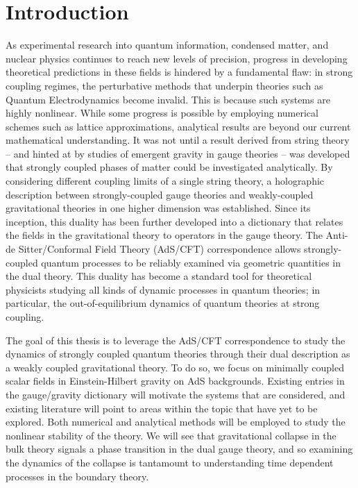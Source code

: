 \documentclass[../PhD.tex]{subfiles}
\begin{document}

\chapter{Introduction}
\label{ch: intro}

As experimental research into quantum information, condensed matter, and nuclear physics continues to reach new levels of precision, progress in developing theoretical predictions in these fields is hindered by a fundamental flaw: in strong coupling regimes, the perturbative methods that underpin theories such as Quantum Electrodynamics become invalid. This is because such systems are highly nonlinear. While some progress is possible by employing numerical schemes such as lattice approximations, analytical results are beyond our current mathematical understanding. It was not until a result derived from string theory -- and hinted at by studies of emergent gravity in gauge theories -- was developed that  strongly coupled phases of matter could be investigated analytically. By considering different coupling limits of a single string theory, a holographic description between strongly-coupled gauge theories and weakly-coupled gravitational theories in one higher dimension was established. Since its inception, this duality has been further developed into a dictionary that relates the fields in the gravitational theory to operators in the gauge theory. The Anti-de Sitter/Conformal Field Theory (AdS/CFT) correspondence allows strongly-coupled quantum processes to be reliably examined via geometric quantities in the dual theory. This duality has become a standard tool for theoretical physicists studying all kinds of dynamic processes in quantum theories; in particular, the out-of-equilibrium dynamics of quantum theories at strong coupling.

The goal of this thesis is to leverage the AdS/CFT correspondence to study the dynamics of strongly coupled quantum theories through their dual description as a weakly coupled gravitational theory. To do so, we focus on minimally coupled scalar fields in Einstein-Hilbert gravity on AdS backgrounds. Existing entries in the gauge/gravity dictionary will motivate the systems that are considered, and existing literature will point to areas within the topic that have yet to be explored. Both numerical and analytical methods will be employed to study the nonlinear stability of the theory. We will see that gravitational collapse in the bulk theory signals a phase transition in the dual gauge theory, and so examining the dynamics of the collapse is tantamount to understanding time dependent processes in the boundary theory.
\end{document}
